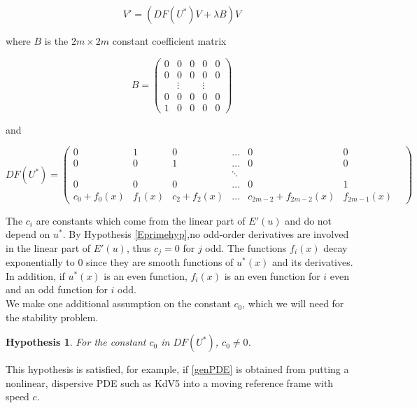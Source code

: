 \documentclass[12pt]{article}
\newtheorem{hypothesis}{Hypothesis}
\begin{document}
\begin{equation}\label{ODEeig2}
V' = ( DF(U^*)V + \lambda B) V 
\end{equation}

where $B$ is the $2m \times 2m$ constant coefficient matrix

\begin{equation}
B = \begin{pmatrix}0 & 0 & 0 & 0 & 0 \\0 & 0 & 0 & 0 & 0 \\  & 
\vdots &  & \vdots & \\0 & 0 & 0 & 0 & 0 \\1 & 0 & 0 & 0 & 0 \end{pmatrix} 
\end{equation}

and 

\begin{equation}
DF(U^*) = \begin{pmatrix}
0 & 1 & 0 & \dots & 0 & 0 \\
0 & 0 & 1 & \dots & 0 & 0 \\
& &  & \ddots &  & & \\
0 & 0 & 0 & \dots & 0 & 1 \\
c_0 + f_0(x) & f_1(x) & c_2 + f_2(x) &
 \dots & c_{2m-2} + f_{2m-2}(x) & f_{2m-1}(x)
\end{pmatrix}
\end{equation}

The $c_i$ are constants which come from the linear part of $E'(u)$ and do not depend on $u^*$. By Hypothesis \ref{Eprimehyp},no odd-order derivatives are involved in the linear part of $E'(u)$, thus $c_j = 0$ for $j$ odd. The functions $f_i(x)$ decay exponentially to 0 since they are smooth functions of $u^*(x)$ and its derivatives. In addition, if $u^*(x)$ is an even function, $f_i(x)$ is an even function for $i$ even and an odd function for $i$ odd.\\

We make one additional assumption on the constant $c_0$, which we will need for the stability problem.

\begin{hypothesis}\label{c0nonzero}
For the constant $c_0$ in $DF(U^*)$, $c_0 \neq 0$.
\end{hypothesis}

This hypothesis is satisfied, for example, if \eqref{genPDE} is obtained from putting a nonlinear, dispersive PDE such as KdV5 into a moving reference frame with speed $c$. \\
\end{document}
